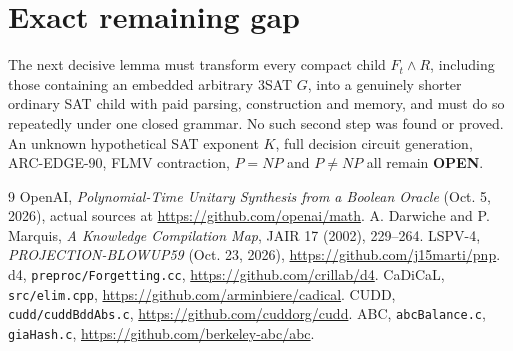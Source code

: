 \documentclass[11pt]{article}
\begin{document}
\section{Exact remaining gap}
The next decisive lemma must transform every compact
child $F_t\wedge R$, including those containing an embedded
arbitrary 3SAT $G$, into a genuinely shorter ordinary SAT
child with paid parsing, construction and memory, and
must do so repeatedly under one closed grammar.
No such second step was found or proved.
An unknown hypothetical SAT exponent $K$, full decision
circuit generation, ARC-EDGE-90, FLMV contraction,
$P=NP$ and $P\ne NP$ all remain \textbf{OPEN}.

\begin{thebibliography}{9}
 OpenAI, \emph{Polynomial-Time Unitary Synthesis from a
Boolean Oracle} (Oct. 5, 2026), actual sources at
\url{https://github.com/openai/math}.
 A. Darwiche and P. Marquis,
\emph{A Knowledge Compilation Map}, JAIR 17 (2002), 229--264.
 LSPV-4, \emph{PROJECTION-BLOWUP59}
(Oct. 23, 2026), \url{https://github.com/j15marti/pnp}.
 d4, \texttt{preproc/Forgetting.cc},
\url{https://github.com/crillab/d4}.
 CaDiCaL, \texttt{src/elim.cpp},
\url{https://github.com/arminbiere/cadical}.
 CUDD, \texttt{cudd/cuddBddAbs.c},
\url{https://github.com/cuddorg/cudd}.
 ABC, \texttt{abcBalance.c}, \texttt{giaHash.c},
\url{https://github.com/berkeley-abc/abc}.
\end{thebibliography}
\end{document}
